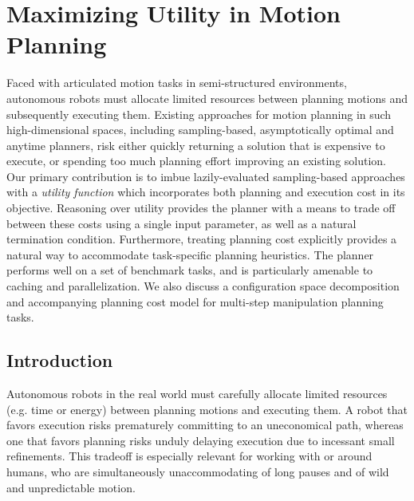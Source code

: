 \chapter{Maximizing Utility in Motion Planning}
\label{chap:utility}


Faced with articulated motion tasks in semi-structured environments,
autonomous robots must allocate limited resources between planning
motions and subsequently executing them.
Existing approaches for motion planning in such high-dimensional
spaces,
including sampling-based, asymptotically optimal and anytime planners,
risk either quickly returning a solution that is expensive to execute,
or spending too much planning effort improving an existing solution.
Our primary contribution is to imbue 
lazily-evaluated sampling-based approaches
with a \emph{utility function}
which incorporates both planning and execution cost in its objective.
Reasoning over utility provides the planner
with a means to trade off between these costs using a single input
parameter,
as well as a natural termination condition.
Furthermore,
treating planning cost explicitly
provides a natural way to accommodate task-specific planning
heuristics.
The planner performs well on a set of benchmark tasks,
and is particularly amenable to caching
and parallelization.
We also discuss a configuration space decomposition
and accompanying planning cost model
for multi-step manipulation planning tasks.

\section{Introduction}


Autonomous robots in the real world
must carefully allocate limited resources (e.g. time or energy)
between planning motions and executing them.
A robot that favors execution
risks prematurely committing to an uneconomical path, whereas
one that favors planning risks unduly delaying execution 
due to incessant small refinements.
This tradeoff is especially relevant for working with
or around humans, who are simultaneously 
unaccommodating of long pauses
and of wild and unpredictable motion.

